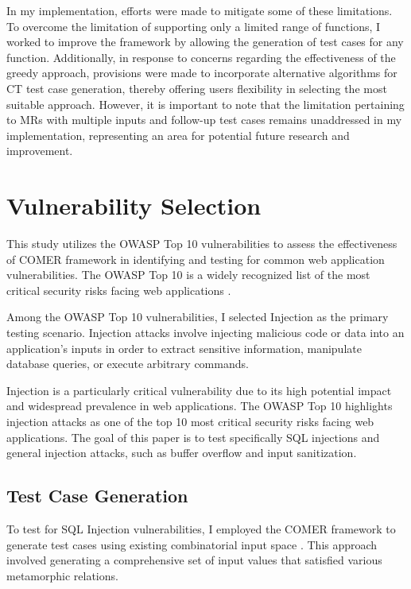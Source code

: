 In my implementation, efforts were made to mitigate some of these limitations.
To overcome the limitation of supporting only a limited range of functions, I worked to improve the framework by allowing the generation of test cases for any function.
Additionally, in response to concerns regarding the effectiveness of the greedy approach, provisions were made to incorporate alternative algorithms for CT test case generation, thereby offering users flexibility in selecting the most suitable approach.
However, it is important to note that the limitation pertaining to MRs with multiple inputs and follow-up test cases remains unaddressed in my implementation, representing an area for potential future research and improvement.

\section{Vulnerability Selection}\label{sec:vulnerability-selection}

This study utilizes the OWASP Top 10 vulnerabilities to assess the effectiveness of COMER framework in identifying and testing for common web application vulnerabilities. The OWASP Top 10 is a widely recognized list of the most critical security risks facing web applications \cite{OWASP}.

Among the OWASP Top 10 vulnerabilities, I selected Injection as the primary testing scenario. Injection attacks involve injecting malicious code or data into an application's inputs in order to extract sensitive information, manipulate database queries, or execute arbitrary commands.

Injection is a particularly critical vulnerability due to its high potential impact and widespread prevalence in web applications. The OWASP Top 10 highlights injection attacks as one of the top 10 most critical security risks facing web applications. The goal of this paper is to test specifically SQL injections and general injection attacks, such as buffer overflow and input sanitization.

\subsection{Test Case Generation}\label{sec:test-case-generation}

To test for SQL Injection vulnerabilities, I employed the COMER framework to generate test cases using existing combinatorial input space \cite{SQLInjection}. This approach involved generating a comprehensive set of input values that satisfied various metamorphic relations.

